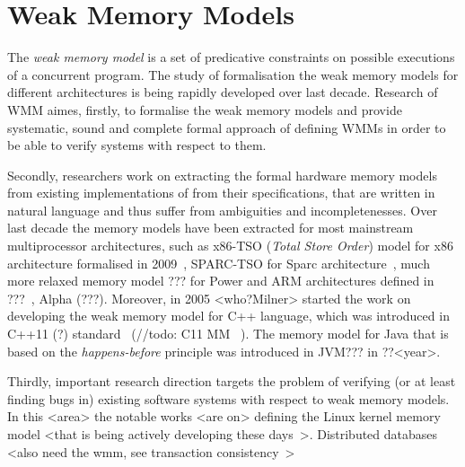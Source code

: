 \chapter{Weak Memory Models}
\label{ch:wmm}

The \textit{weak memory model} is a set of predicative constraints on possible executions of a concurrent program. The study of formalisation the weak memory models for different architectures is being rapidly developed over last decade. Research of WMM aimes, firstly, to formalise the weak memory models and provide systematic, sound and complete formal approach of defining WMMs in order to be able to verify systems with respect to them.


Secondly, researchers work on extracting the formal hardware memory models from existing implementations of from their specifications, that are written in natural language and thus suffer from ambiguities and incompletenesses. Over last decade the memory models have been extracted for most mainstream multiprocessor architectures, such as x86-TSO (\textit{Total Store Order}) model for x86 architecture formalised in 2009~\cite{owens2009better}, SPARC-TSO for Sparc architecture~\cite{?!?!?!}, much more relaxed memory model ??? for Power and ARM architectures defined in ???~\cite{sarkar2011understanding}, Alpha (???). Moreover, in 2005 <who?Milner> started the work on developing the weak memory model for C++ language, which was introduced in C++11 (?) standard~\cite{???} (//todo: C11 MM ~\cite{batty2011mathematizing}). The memory model for Java that is based on the \textit{happens-before} principle was introduced in JVM??? in ??<year>. 

Thirdly, important research direction targets the problem of verifying (or at least finding bugs in) existing software systems with respect to weak memory models. In this <area> the notable works <are on> defining the Linux kernel memory model <that is being actively developing these days~\cite{kernel_wmm_1}>. Distributed databases <also need the wmm, see transaction consistency~\cite{bailis2013highly}>


